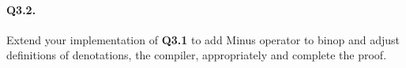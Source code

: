  \paragraph{Q3.2.} Extend your implementation of \textbf{Q3.1} to add Minus operator to binop and adjust definitions of denotations, the compiler, appropriately and complete the proof.\begin{coqdoccode}
\coqdocemptyline
\end{coqdoccode}
